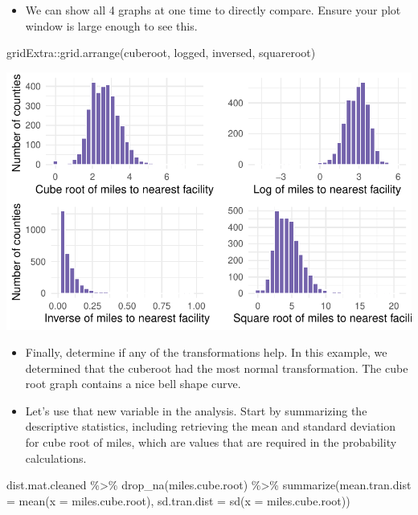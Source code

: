 \documentclass[
  letterpaper,
  DIV=11,
  numbers=noendperiod]{scrreprt}
\newenvironment{Shaded}{\begin{snugshade}}{\end{snugshade}}
\newcommand{\AttributeTok}[1]{\textcolor[rgb]{0.40,0.45,0.13}{#1}}
\newcommand{\FunctionTok}[1]{\textcolor[rgb]{0.28,0.35,0.67}{#1}}
\newcommand{\NormalTok}[1]{\textcolor[rgb]{0.00,0.23,0.31}{#1}}
\newcommand{\SpecialCharTok}[1]{\textcolor[rgb]{0.37,0.37,0.37}{#1}}
\providecommand{\tightlist}{%
  \setlength{\itemsep}{0pt}\setlength{\parskip}{0pt}}\usepackage{longtable,booktabs,array}
\begin{document}
\begin{itemize}
\tightlist
\item
  We can show all 4 graphs at one time to directly compare. Ensure your
  plot window is large enough to see this.
\end{itemize}

\begin{Shaded}
\begin{Highlighting}[]
\NormalTok{gridExtra}\SpecialCharTok{::}\FunctionTok{grid.arrange}\NormalTok{(cuberoot, logged, inversed, squareroot)}
\end{Highlighting}
\end{Shaded}

\includegraphics{probability_files/figure-pdf/unnamed-chunk-60-1.pdf}

\begin{itemize}
\item
  Finally, determine if any of the transformations help. In this
  example, we determined that the cuberoot had the most normal
  transformation. The cube root graph contains a nice bell shape curve.
\item
  Let's use that new variable in the analysis. Start by summarizing the
  descriptive statistics, including retrieving the mean and standard
  deviation for cube root of miles, which are values that are required
  in the probability calculations.
\end{itemize}

\begin{Shaded}
\begin{Highlighting}[]
\NormalTok{dist.mat.cleaned }\SpecialCharTok{\%\textgreater{}\%}
    \FunctionTok{drop\_na}\NormalTok{(miles.cube.root) }\SpecialCharTok{\%\textgreater{}\%}
    \FunctionTok{summarize}\NormalTok{(}\AttributeTok{mean.tran.dist =} \FunctionTok{mean}\NormalTok{(}\AttributeTok{x =}\NormalTok{ miles.cube.root), }\AttributeTok{sd.tran.dist =} \FunctionTok{sd}\NormalTok{(}\AttributeTok{x =}\NormalTok{ miles.cube.root))}
\end{Highlighting}
\end{Shaded}
\end{document}
